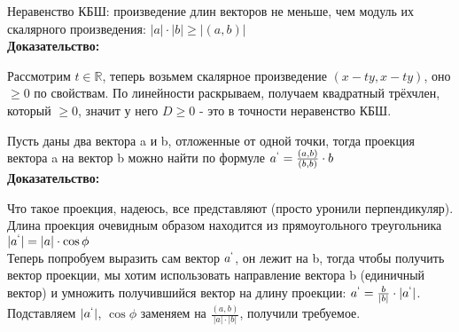 \documentclass[12pt]{article}
\newcommand{\R}{\mathbb{R}}
\begin{document}
\begin{theorembox}
Неравенство КБШ: произведение длин векторов не меньше, чем модуль их скалярного произведения: $|a| \cdot |b| \geq |(a, b)|$\\

\textbf{Доказательство:}

Рассмотрим $t \in \R$, теперь возьмем скалярное произведение $(x - ty, x- ty)$, оно $\geq 0$ по свойствам. По линейности раскрываем, получаем квадратный трёхчлен, который $\geq 0$, значит у него $D \geq 0$ - это в точности неравенство КБШ.
\end{theorembox}

\begin{theorembox}
Пусть даны два вектора a и b, отложенные от одной точки, тогда проекция вектора a на вектор b можно найти по формуле $a^` = \frac{(a, b)}{(b, b)} \cdot b$\\

\textbf{Доказательство:}

Что такое проекция, надеюсь, все представляют (просто уронили перпендикуляр). Длина проекция очевидным образом находится из прямоугольного треугольника $|a^`| = |a| \cdot \cos{\phi}$\\

Теперь попробуем выразить сам вектор $a^`$, он лежит на b, тогда чтобы получить вектор проекции, мы хотим использовать направление вектора b (единичный вектор) и умножить получившийся вектор на длину проекции: $a^` = \frac{b}{|b|} \cdot |a^`|$. Подставляем $|a^`|$, $\cos{\phi}$ заменяем на $\frac{(a, b)}{|a| \cdot |b|}$, получили требуемое.

\end{theorembox}
\end{document}

